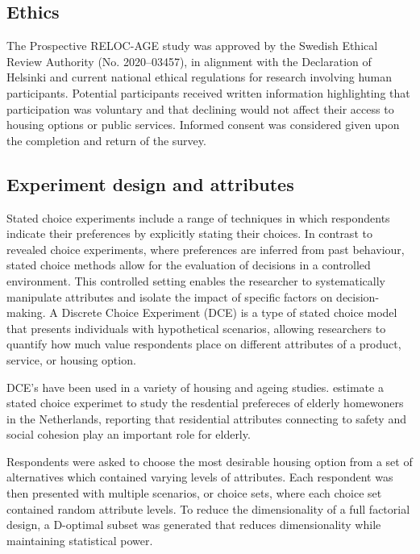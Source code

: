 \documentclass[3p,11pt ]{elsarticle}
\begin{document}
\subsection{Ethics}

The Prospective RELOC-AGE study was approved by the Swedish Ethical Review Authority (No. 2020–03457), in alignment with the Declaration of Helsinki and current national ethical regulations for research involving human participants.
Potential participants received written information highlighting that participation was voluntary and that declining would not affect their access to housing options or public services.
Informed consent was considered given upon the completion and return of the survey.



\subsection{Experiment design and attributes}

Stated choice experiments include a range of techniques in which respondents indicate their preferences by explicitly stating their choices.
In contrast to revealed choice experiments, where preferences are inferred from past behaviour, stated choice methods allow for the evaluation of decisions in a controlled environment.
This controlled setting enables the researcher to systematically manipulate attributes and isolate the impact of specific factors on decision-making.
A Discrete Choice Experiment (DCE) is a type of stated choice model that presents individuals with hypothetical scenarios, allowing researchers to quantify how much value respondents place on different attributes of a product, service, or housing option.

DCE's have been used in a variety of housing and ageing studies.
\cite{ossokinaBestLivingConcepts2020} estimate a stated choice experimet to study the resdential prefereces of elderly homewoners in the Netherlands,
reporting that residential attributes connecting to safety and social cohesion play an important role for elderly.
\cite{ossokinaReferencedependentHousingChoice2022}


Respondents were asked to choose the most desirable housing option from a set of alternatives which contained varying levels of attributes.
Each respondent was then presented with multiple scenarios, or choice sets,
where each choice set contained random attribute levels.
To reduce the dimensionality of a full factorial design, a D-optimal subset was generated that reduces dimensionality while maintaining statistical power.
\end{document}
